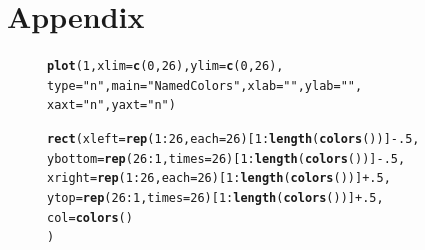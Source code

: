 \documentclass{tufte-book}\usepackage[]{graphicx}\usepackage[]{color}
\makeatletter
\newcommand{\hlnum}[1]{\textcolor[rgb]{0.686,0.059,0.569}{#1}}%
\newcommand{\hlstr}[1]{\textcolor[rgb]{0.192,0.494,0.8}{#1}}%
\newcommand{\hlopt}[1]{\textcolor[rgb]{0,0,0}{#1}}%
\newcommand{\hlstd}[1]{\textcolor[rgb]{0.345,0.345,0.345}{#1}}%
\newcommand{\hlkwc}[1]{\textcolor[rgb]{0.333,0.667,0.333}{#1}}%
\newcommand{\hlkwd}[1]{\textcolor[rgb]{0.737,0.353,0.396}{\textbf{#1}}}%
\newenvironment{kframe}{%
 \def\at@end@of@kframe{}%
 \ifinner\ifhmode%
  \def\at@end@of@kframe{\end{minipage}}%
  \begin{minipage}{\columnwidth}%
 \fi\fi%
 \def\FrameCommand##1{\hskip\@totalleftmargin \hskip-\fboxsep
 \colorbox{shadecolor}{##1}\hskip-\fboxsep
     \hskip-\linewidth \hskip-\@totalleftmargin \hskip\columnwidth}%
 \MakeFramed {\advance\hsize-\width
   \@totalleftmargin\z@ \linewidth\hsize
   \@setminipage}}%
 {\par\unskip\endMakeFramed%
 \at@end@of@kframe}
\newenvironment{knitrout}{}{} %
\makeatother
\begin{document}
\chapter{Appendix}
\label{ch:X}

\begin{figure}[h]
\begin{footnotesize}
\begin{knitrout}
\color{fgcolor}\begin{kframe}
\begin{alltt}
\hlkwd{plot}\hlstd{(}\hlnum{1}\hlstd{,} \hlkwc{xlim} \hlstd{=} \hlkwd{c}\hlstd{(}\hlnum{0}\hlstd{,} \hlnum{26}\hlstd{),} \hlkwc{ylim} \hlstd{=} \hlkwd{c}\hlstd{(}\hlnum{0}\hlstd{,} \hlnum{26}\hlstd{),}
     \hlkwc{type} \hlstd{=} \hlstr{"n"}\hlstd{,} \hlkwc{main} \hlstd{=} \hlstr{"Named Colors"}\hlstd{,} \hlkwc{xlab} \hlstd{=} \hlstr{""}\hlstd{,} \hlkwc{ylab} \hlstd{=} \hlstr{""}\hlstd{,}
     \hlkwc{xaxt} \hlstd{=} \hlstr{"n"}\hlstd{,} \hlkwc{yaxt} \hlstd{=} \hlstr{"n"}\hlstd{)}

\hlkwd{rect}\hlstd{(}\hlkwc{xleft} \hlstd{=} \hlkwd{rep}\hlstd{(}\hlnum{1}\hlopt{:}\hlnum{26}\hlstd{,} \hlkwc{each} \hlstd{=} \hlnum{26}\hlstd{)[}\hlnum{1}\hlopt{:}\hlkwd{length}\hlstd{(}\hlkwd{colors}\hlstd{())]} \hlopt{-} \hlnum{.5}\hlstd{,}
     \hlkwc{ybottom} \hlstd{=} \hlkwd{rep}\hlstd{(}\hlnum{26}\hlopt{:}\hlnum{1}\hlstd{,} \hlkwc{times} \hlstd{=} \hlnum{26}\hlstd{)[}\hlnum{1}\hlopt{:}\hlkwd{length}\hlstd{(}\hlkwd{colors}\hlstd{())]} \hlopt{-} \hlnum{.5}\hlstd{,}
     \hlkwc{xright} \hlstd{=} \hlkwd{rep}\hlstd{(}\hlnum{1}\hlopt{:}\hlnum{26}\hlstd{,} \hlkwc{each} \hlstd{=} \hlnum{26}\hlstd{)[}\hlnum{1}\hlopt{:}\hlkwd{length}\hlstd{(}\hlkwd{colors}\hlstd{())]} \hlopt{+} \hlnum{.5}\hlstd{,}
     \hlkwc{ytop} \hlstd{=} \hlkwd{rep}\hlstd{(}\hlnum{26}\hlopt{:}\hlnum{1}\hlstd{,} \hlkwc{times} \hlstd{=} \hlnum{26}\hlstd{)[}\hlnum{1}\hlopt{:}\hlkwd{length}\hlstd{(}\hlkwd{colors}\hlstd{())]} \hlopt{+} \hlnum{.5}\hlstd{,}
     \hlkwc{col} \hlstd{=} \hlkwd{colors}\hlstd{()}
     \hlstd{)}


\end{alltt}
\end{kframe}
\end{knitrout}
\end{footnotesize}
\end{figure}
\end{document}
